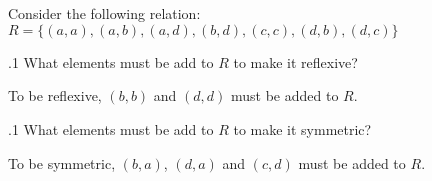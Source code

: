 \documentclass[12pt]{article}
\newenvironment{problem}[2][Problem]{\begin{trivlist}
\item[\hskip \labelsep {\bfseries #1}\hskip \labelsep {\bfseries #2.}]}{\end{trivlist}}
\begin{document}
\section{}
\begin{problem}1
	Consider the following relation:\\
	$R = \{(a,a),(a,b),(a,d),(b,d),(c,c),(d,b),(d,c)\}$
\end{problem}
\begin{problem}1.1
 What elements must be add to $R$ to make it reflexive?
\end{problem}
To be reflexive, $(b,b)$ and $(d,d)$ must be added to $R$.
\begin{problem}1.1
 What elements must be add to $R$ to make it symmetric?
\end{problem}
To be symmetric, $(b,a)$, $(d,a)$ and $(c,d)$ must be added to $R$.



 
\end{document}
